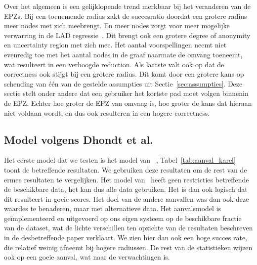 Over het algemeen is een gelijklopende trend merkbaar bij het veranderen van de
\acp{EPZ}. Bij een toenemende radius zakt de succesratio doordat een grotere
radius meer nodes met zich meebrengt. En meer nodes zorgt voor meer mogelijke
verwarring in de \ac{LAD} regressie~\cite{Verdonck_2022}. Dit brengt ook een
grotere degree of anonymity en uncertainty region met zich mee. Het aantal
voorspellingen neemt niet evenredig toe met het aantal nodes in de graaf
naarmate de omvang toeneemt, wat resulteert in een verhoogde reduction. Als
laatste valt ook op dat de correctness ook stijgt bij een grotere radius. Dit
komt door een grotere kans op schending van één van de gestelde assumpties uit
Sectie~\ref{sec:assumpties}. Deze sectie stelt onder andere dat een gebruiker
het kortste pad moet volgen binnenin de \ac{EPZ}. Echter hoe groter de \ac{EPZ}
van omvang is, hoe groter de kans dat hieraan niet voldaan wordt, en dus ook
resulteren in een hogere correctness.

\subsection{Model volgens Dhondt et al.}
Het eerste model dat we testen is het model van
\citeauthor{Dhondt}~\cite{Dhondt}, Tabel~\ref{tab:aanval_karel} toont de
betreffende resultaten. We gebruiken deze resultaten om de rest van de ermee
resultaten te vergelijken. Het model van~\citeauthor{Dhondt} heeft geen
restricties betreffende de beschikbare data, het kan dus alle data gebruiken.
Het is dan ook logisch dat dit resulteert in goeie scores. Het doel van de
andere aanvallen was dan ook deze waardes te benaderen, maar met alternatieve
data. Het aanvalsmodel is geïmplementeerd en uitgevoerd op ons eigen systeem op
de beschikbare fractie van de dataset, wat de lichte verschillen ten opzichte
van de resultaten beschreven in de desbetreffende paper verklaart. We zien hier
dan ook een hoge succes rate, die relatief weinig afneemt bij hogere radiussen.
De rest van de statistieken wijzen ook op een goeie aanval, wat naar de
verwachtingen is.

